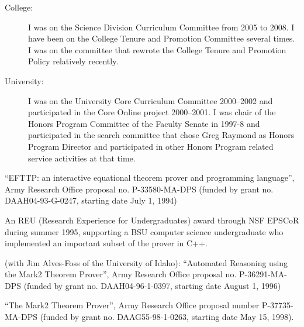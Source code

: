 \begin{description}
\begin{description}
\begin{description}
\item[College:]  I was on the Science Division Curriculum Committee from 2005 to 2008.  I have been on the College Tenure and Promotion Committee several times.  I was on the committee that rewrote the College Tenure and Promotion Policy relatively recently.

\item[University:]   I was on the University Core Curriculum Committee 2000--2002 and participated in the Core Online project 2000--2001.  I was chair of the Honors Program Committee of the Faculty Senate in 1997-8 and participated in the search committee that chose Greg Raymond as Honors Program Director and participated in other Honors Program related service activities at that time. 


\end{description}


\end{description}

\newpage

\item[Research Grants]
\begin{description}
\item
\item[1.] ``EFTTP: an interactive equational theorem prover and programming
language'', Army Research Office proposal no.  P-33580-MA-DPS (funded
by grant no.  DAAH04-93-G-0247, starting date July 1, 1994)

\item[2.] An REU (Research Experience for Undergraduates) award through NSF
EPSCoR during summer 1995, supporting a BSU computer science
undergraduate who implemented an important subset of the prover in
C++.

\item[3.] (with Jim Alves-Foss of the University of Idaho):  ``Automated Reasoning using the Mark2 Theorem Prover'', Army Research Office proposal no.  P-36291-MA-DPS (funded
by grant no.  DAAH04-96-1-0397, starting date August 1, 1996) 

\item[4.] ``The Mark2 Theorem Prover'', Army Research Office proposal
number P-37735-MA-DPS (funded by grant no. DAAG55-98-1-0263, starting
date May 15, 1998).

\end{description}

\newpage

\item[Invited Research Presentations]


\end{description}
